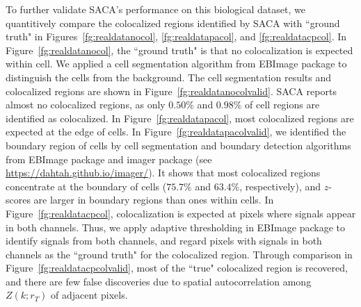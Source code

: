 \documentclass[10pt,twocolumn,twoside]{IEEEtran}
\begin{document}
To further validate SACA's performance on this biological dataset, we quantitively compare the colocalized regions identified by SACA with ``ground truth" in Figures~\ref{fg:realdatanocol}, \ref{fg:realdatapacol}, and \ref{fg:realdatacpcol}. In Figure~\ref{fg:realdatanocol}, the ``ground truth" is that no colocalization is expected within cell. We applied a cell segmentation algorithm from EBImage package \citep[see][]{pau2010ebimage} to distinguish the cells from the background. The cell segmentation results and colocalized regions are shown in Figure~\ref{fg:realdatanocolvalid}. SACA reports almost no colocalized regions, as only $0.50\%$ and $0.98\%$ of cell regions are identified as colocalized. In Figure~\ref{fg:realdatapacol}, most colocalized regions are expected at the edge of cells. In Figure~\ref{fg:realdatapacolvalid}, we identified the boundary region of cells by cell segmentation and boundary detection algorithms from EBImage package and imager package (see \url{https://dahtah.github.io/imager/}). It shows that most colocalized regions concentrate at the boundary of cells ($75.7\%$ and $63.4\%$, respectively), and  $z$-scores are larger in boundary regions than ones within cells. In Figure~\ref{fg:realdatacpcol}, colocalization is expected at pixels where signals appear in both channels. Thus, we apply adaptive thresholding in EBImage package to identify signals from both channels,  and regard pixels with signals in both channels as the ``ground truth" for the colocalized region. Through comparison in Figure~\ref{fg:realdatacpcolvalid}, most of the ``true" colocalized region is recovered, and there are few false discoveries due to spatial autocorrelation among $Z(k;r_T)$ of adjacent pixels. 
\end{document}
